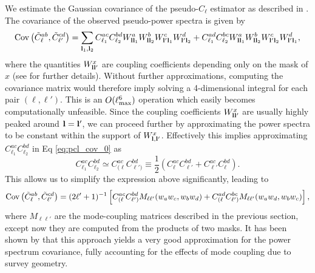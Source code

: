 \documentclass[a4paper,11pt]{article}
\begin{document}
    We estimate the Gaussian covariance of the pseudo-$C_\ell$ estimator as described in \cite{2004MNRAS.349..603E,2019arXiv190611765G}. The covariance of the observed pseudo-power spectra is given by
    \begin{equation}\label{eq:pcl_cov_0}
      {\rm Cov}\left(\tilde{C}^{ab}_\ell,\tilde{C}^{cd}_{\ell'}\right)=\sum_{{\bf l}_1,{\bf l}_2} C^{ac}_{\ell_1}C^{bd}_{\ell_2}W^a_{{\bf l}{\bf l}_1}W^b_{{\bf l}{\bf l}_2}W^c_{{\bf l}'{\bf l}_1}W^d_{{\bf l}'{\bf l}_2} + C^{ad}_{\ell_1}C^{bc}_{\ell_2}W^a_{{\bf l}{\bf l}_1}W^b_{{\bf l}{\bf l}_2}W^c_{{\bf l}'{\bf l}_2}W^d_{{\bf l}'{\bf l}_1},
    \end{equation}
    where the quantities $W^x_{{\bf l}{\bf l}'}$ are coupling coefficients depending only on the mask of $x$ (see \cite{2019arXiv190611765G} for further details). Without further approximations, computing the covariance matrix would therefore imply solving a 4-dimensional integral for each pair $(\ell,\ell')$. This is an $O(\ell_{\rm max}^6)$ operation which easily becomes computationally unfeasible. Since the coupling coefficients $W^x_{{\bf l}{\bf l}'}$ are usually highly peaked around ${\bf l}={\bf l}'$, we can proceed further by approximating the power spectra to be constant within the support of $W^x_{{\bf l},{\bf l}'}$. Effectively this implies approximating $C^{ac}_{\ell_1}C^{bd}_{\ell_2}$ in Eq \ref{eq:pcl_cov_0} as
    \begin{equation}
      C^{ac}_{\ell_1}C^{bd}_{\ell_2}\simeq C^{ac}_{(\ell}C^{bd}_{\ell')}\equiv\frac{1}{2}\left(C^{ac}_\ell C^{bd}_{\ell'}+C^{ac}_{\ell'} C^{bd}_\ell\right).
    \end{equation}
    This allows us to simplify the expression above significantly, leading to
    \begin{equation}
      {\rm Cov}\left(\tilde{C}^{ab}_\ell,\tilde{C}^{cd}_{\ell'}\right)=(2\ell'+1)^{-1}\left[C^{ac}_{(\ell}C^{bd}_{\ell')}M_{\ell\ell'}(w_aw_c,w_bw_d)+C^{ad}_{(\ell}C^{bc}_{\ell')}M_{\ell\ell'}(w_aw_d,w_bw_c)\right],
    \end{equation}
    where $M_{\ell\ell'}$ are the mode-coupling matrices described in the previous section, except now they are computed from the products of two masks. It has been shown by \cite{2019arXiv190611765G} that this approach yields a very good approximation for the power spectrum covariance, fully accounting for the effects of mode coupling due to survey geometry.
\end{document}
